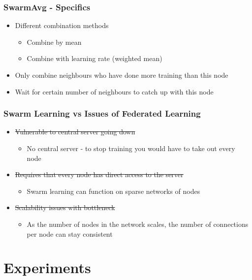 \documentclass{beamer}
\begin{document}
	\begin{frame}
		\frametitle{SwarmAvg - Specifics}
		\begin{itemize}
			\item Different combination methods
			\begin{itemize}
				\item Combine by mean
				\item Combine with learning rate (weighted mean)
			\end{itemize}
			\item Only combine neighbours who have done more training than this node
			\item Wait for certain number of neighbours to catch up with this node
		\end{itemize}
	\end{frame}

	\begin{frame}
		\frametitle{Swarm Learning vs Issues of Federated Learning}
		\begin{itemize}
			\item \sout{Vulnerable to central server going down}
			\begin{itemize}
				\item No central server - to stop training you would have to take out every node
			\end{itemize}
			\item \sout{Requires that every node has direct access to the server}
			\begin{itemize}
				\item Swarm learning can function on sparse networks of nodes
			\end{itemize}
			\item \sout{Scalability issues with bottleneck}
			\begin{itemize}
				\item As the number of nodes in the network scales, the number of connections per node can stay consistent
			\end{itemize}
		\end{itemize}
	\end{frame}

	\section{Experiments}
	
\end{document}

